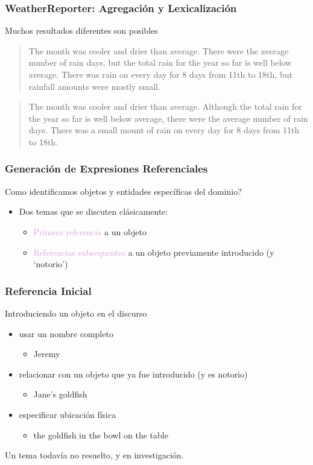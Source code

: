 \documentclass[compress,color=usenames]{beamer}
\newcommand{\mH}[1]{\textcolor{Plum}{#1}}
\begin{document}
\begin{frame}
\frametitle{WeatherReporter: Agregaci\'on y Lexicalizaci\'on}

Muchos resultados diferentes son posibles

\begin{quote}
{{The month was cooler and drier than average.
There were the average number of rain days, but the total rain for the year so far is well below average. There was rain on every day for 8 days from 11th to 18th, but rainfall amounts were mostly small.}}
\end{quote}

\begin{quote}
{{The month was cooler and drier than average.
Although the total rain for the year so far is well below average, there were the average number of rain days.  There was a small mount of rain on every day for 8 days from 11th to 18th.}}
\end{quote}

\end{frame}

\begin{frame}
\frametitle{Generaci\'on de Expresiones Referenciales}

Como identificamos objetos y entidades espec\'ificas del dominio?

\begin{itemize}
\item {{Dos temas que se discuten cl\'asicamente:}}
\begin{itemize}
\item \mH{Primera referencia} a un objeto
\item \mH{Referencias subsequentes} a un objeto previamente introducido (y `notorio')
\end{itemize}
\end{itemize}
\end{frame}

\begin{frame}
\frametitle{Referencia Inicial}

Introduciendo un objeto en el discurso

\begin{itemize}
\item {{usar un nombre completo}}
\begin{itemize}
\item Jeremy
\end{itemize}
\item relacionar con un objeto que ya fue introducido (y es notorio)
\begin{itemize}
\item Jane's goldfish
\end{itemize}
\item especificar ubicaci\'on f\'isica
\begin{itemize}
\item the goldfish in the bowl on the table
\end{itemize}
\end{itemize}

Un tema todav\'ia no resuelto, y en investigaci\'on.
\end{frame}
\end{document}
